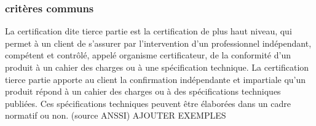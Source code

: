 \subsubsection{critères communs}
La certification dite tierce partie est la certification de plus haut niveau, qui permet à un client de s’assurer par l’intervention d’un professionnel indépendant, compétent et contrôlé, appelé organisme certificateur, de la conformité d’un produit à un cahier des charges ou à une spécification technique. La certification tierce partie apporte au client la confirmation indépendante et impartiale qu’un produit répond à un cahier des charges ou à des spécifications techniques publiées. Ces spécifications techniques peuvent être élaborées dans un cadre normatif ou non.
(source ANSSI)
AJOUTER EXEMPLES

